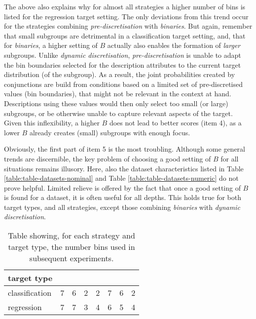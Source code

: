 \documentclass[smallextended]{svjour3}
\newcommand{\parameter}{\emph}
\newcommand{\dyndis}{\parameter{dynamic discretisation}}
\newcommand{\predis}{\parameter{pre-discretisation}}
\newcommand{\binaries}{\parameter{binaries}}
\newcommand{\dbca}[1]{\ifthenelse{\equal{#1}{0}}{3-dbca}{3-dbca\textsuperscript{#1}}}
\newcommand{\dbcb}[1]{\ifthenelse{\equal{#1}{0}}{4-dbcb}{4-dbcb\textsuperscript{#1}}}
\newcommand{\dnca}[1]{\ifthenelse{\equal{#1}{0}}{7-dnca}{7-dnca\textsuperscript{#1}}}
\newcommand{\dncb}[1]{\ifthenelse{\equal{#1}{0}}{8-dncb}{8-dncb\textsuperscript{#1}}}
\newcommand{\pbfa}[1]{\ifthenelse{\equal{#1}{0}}{9-pbfa}{9-pbfa\textsuperscript{#1}}}
\newcommand{\pbfb}[1]{\ifthenelse{\equal{#1}{0}}{10-pbfb}{10-pbfb\textsuperscript{#1}}}
\newcommand{\pnca}[1]{\ifthenelse{\equal{#1}{0}}{15-pnca}{15-pnca\textsuperscript{#1}}}
\begin{document}
The above also explains why for almost all strategies a higher number of bins is listed for the regression target setting.
The only deviations from this trend occur for the strategies combining \predis{} with \binaries{}.
But again, remember that small subgroups are detrimental in a classification target setting, and, that for \binaries{}, a higher setting of $B$ actually also enables the formation of \emph{larger} subgroups.
Unlike \dyndis{}, \predis{} is unable to adapt the bin boundaries selected for the description attributes to the current target distribution (of the subgroup).
As a result, the joint probabilities created by conjunctions are build from conditions based on a limited set of pre-discretised values (bin boundaries), that might not be relevant in the context at hand.
Descriptions using these values would then only select too small (or large) subgroups, or be otherwise unable to capture relevant aspects of the target.
Given this inflexibility, a higher $B$ does not lead to better scores (item 4), as a lower $B$ already creates (small) subgroups with enough focus.

Obviously, the first part of item 5 is the most troubling.
Although some general trends are discernible, the key problem of choosing a good setting of $B$ for all situations remains illusory.
Here, also the dataset characteristics listed in Table \ref{table:table-datasets-nominal} and Table \ref{table:table-datasets-numeric} do not prove helpful.
Limited relieve is offered by the fact that once a good setting of $B$ is found for a dataset, it is often useful for all depths.
This holds true for both target types, and all strategies, except those combining \binaries{} with \dyndis{}.

\begin{table}
\centering
\caption{Table showing, for each strategy and target type, the number bins used in subsequent experiments.}
\label{table:best-number-of-bins}
\begin{tabular}{l|ccccccc}
target type    & \dbca{} & \dbcb{} & \dnca{} & \dncb{} & \pbfa{} & \pbfb{} & \pnca{}\\
\hline
classification & 7       & 6       & 2       & 2       & 7       & 6       & 2\\
regression     & 7       & 7       & 3       & 4       & 6       & 5       & 4\\
\end{tabular}
\end{table}
\end{document}
